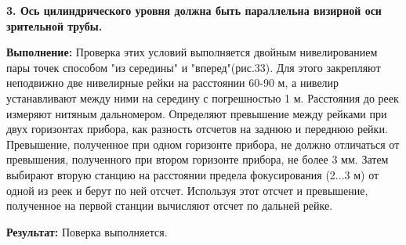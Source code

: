 \documentclass[a4paper]{article}
\begin{document}
\begin{newpage}
{        \par\textbf{3. Ось цилиндрического уровня должна быть параллельна визирной оси зрительной трубы.}
        \par\textbf{Выполнение:} Проверка этих условий выполняется двойным нивелированием пары точек способом "из середины" и "вперед"(рис.33). Для этого закрепляют неподвижно две нивелирные рейки на расстоянии 60-90 м, а нивелир устанавливают между ними на середину с погрешностью 1 м. Расстояния до реек измеряют нитяным дальномером. Определяют превышение между рейками при двух горизонтах прибора, как разность отсчетов на заднюю и переднюю рейки. Превышение, полученное при одном горизонте прибора, не должно отличаться от превышения, полученного при втором горизонте прибора, не более 3 мм. Затем выбирают вторую станцию на расстоянии предела фокусирования (2...3 м) от одной из реек и берут по ней отсчет. Используя этот отсчет и превышение, полученное на первой станции вычисляют отсчет по дальней рейке.
        \par\textbf{Результат:} Поверка выполняется.\\
    }

\end{newpage}
\end{document}
